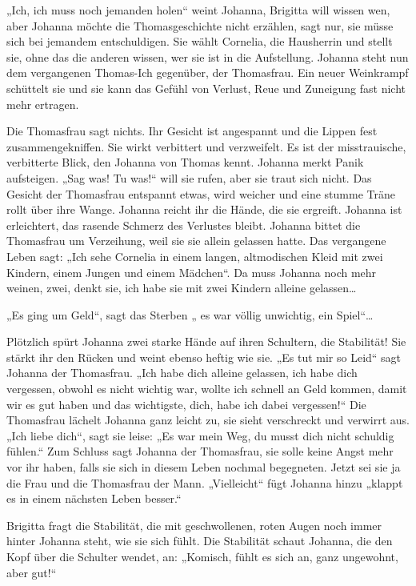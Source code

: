 \documentclass[10pt,titlepage,a5paper]{book}
\begin{document}
„Ich, ich muss noch jemanden holen“ weint Johanna, Brigitta will wissen wen, aber Johanna möchte die Thomasgeschichte nicht er\-zählen, sagt nur, sie müsse sich bei jemandem entschuldigen. Sie wählt Cornelia, die Hausherrin und stellt sie, ohne das die anderen wissen, wer sie ist in die Aufstellung. Johanna steht nun dem vergangenen Thomas-Ich gegenüber, der Thomasfrau. Ein neuer Weinkrampf schüttelt sie und sie kann das Gefühl von Verlust, Reue und Zuneigung fast nicht mehr ertragen.

Die Thomasfrau sagt nichts. Ihr Gesicht ist angespannt und die Lippen fest zusammengekniffen. Sie wirkt verbittert und verzweifelt. Es ist der misstrauische, verbitterte Blick, den Johanna von Thomas kennt. Johanna merkt Panik aufsteigen. „Sag was! Tu was!“ will sie rufen, aber sie traut sich nicht. Das Gesicht der Thomasfrau entspannt etwas, wird weicher und eine stumme Träne rollt über ihre Wange. Johanna reicht ihr die Hände, die sie ergreift. Johanna ist erleichtert, das rasende Schmerz des Verlustes bleibt. Johanna bittet die Thomasfrau um Verzeihung, weil sie sie allein gelassen hatte.  Das vergangene Leben sagt: „Ich sehe Cornelia in einem langen, altmodischen Kleid mit zwei Kindern, einem Jungen und einem Mädchen“. Da muss Johanna noch mehr weinen, zwei, denkt sie, ich habe sie mit zwei Kindern alleine gelassen\dots 

„Es ging um Geld“, sagt das Sterben „ es war völlig unwichtig, ein Spiel“\dots 

Plötzlich spürt Johanna zwei starke Hände auf ihren Schultern, die Stabilität! Sie stärkt ihr den Rücken und weint ebenso heftig wie sie. „Es tut mir so Leid“  sagt Johanna der Thomasfrau. „Ich habe dich alleine gelassen, ich habe dich vergessen, obwohl es nicht wichtig war, wollte ich schnell an Geld kommen, damit wir es gut haben und das wichtigste, dich, habe ich dabei vergessen!“ Die Thomasfrau lächelt Johanna ganz leicht zu, sie sieht verschreckt und verwirrt aus. „Ich liebe dich“, sagt sie leise: „Es war mein Weg, du musst dich nicht schuldig fühlen.“ Zum Schluss sagt Johanna der Thomasfrau, sie solle keine Angst mehr vor ihr haben, falls sie sich in diesem Leben nochmal begegneten. Jetzt sei sie ja die Frau und die Thomasfrau der Mann. „Vielleicht“ fügt Johanna hinzu „klappt es in einem nächsten Leben besser.“ 

Brigitta fragt die Stabilität, die mit geschwollenen, roten Augen noch immer hinter Johanna steht, wie sie sich fühlt. Die Stabilität schaut Johanna, die den Kopf über die Schulter wendet, an: „Komisch, fühlt es sich an, ganz ungewohnt, aber gut!“
\end{document}

